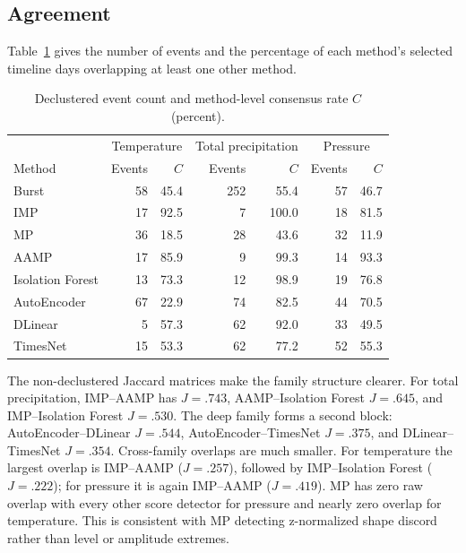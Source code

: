 \documentclass[11pt,a4paper]{article}
\begin{document}
\subsection{Agreement}
Table~\ref{tab:agreement} gives the number of events and the percentage of each
method's selected timeline days overlapping at least one other method.

\begin{table}[ht]
\centering
\caption{Declustered event count and method-level consensus rate $C$ (percent).}
\label{tab:agreement}
\small
\begin{tabular}{lrr@{\qquad}rr@{\qquad}rr}
\toprule
& \multicolumn{2}{c}{Temperature} & \multicolumn{2}{c}{Total precipitation}
& \multicolumn{2}{c}{Pressure}\\
Method & Events & $C$ & Events & $C$ & Events & $C$\\
\midrule
Burst             & 58 & 45.4 & 252 & 55.4 & 57 & 46.7\\
IMP               & 17 & 92.5 &   7 &100.0 & 18 & 81.5\\
MP                & 36 & 18.5 &  28 & 43.6 & 32 & 11.9\\
AAMP              & 17 & 85.9 &   9 & 99.3 & 14 & 93.3\\
Isolation Forest  & 13 & 73.3 &  12 & 98.9 & 19 & 76.8\\
AutoEncoder       & 67 & 22.9 &  74 & 82.5 & 44 & 70.5\\
DLinear           &  5 & 57.3 &  62 & 92.0 & 33 & 49.5\\
TimesNet          & 15 & 53.3 &  62 & 77.2 & 52 & 55.3\\
\bottomrule
\end{tabular}
\end{table}

The non-declustered Jaccard matrices make the family structure clearer.
For total precipitation, IMP--AAMP has $J=.743$, AAMP--Isolation Forest $J=.645$,
and IMP--Isolation Forest $J=.530$. The deep family forms a second block:
AutoEncoder--DLinear $J=.544$, AutoEncoder--TimesNet $J=.375$, and
DLinear--TimesNet $J=.354$. Cross-family overlaps are much smaller. For
temperature the largest overlap is IMP--AAMP ($J=.257$), followed by
IMP--Isolation Forest ($J=.222$); for pressure it is again IMP--AAMP
($J=.419$). MP has zero raw overlap with every other score detector for
pressure and nearly zero overlap for temperature. This is consistent with MP
detecting z-normalized shape discord rather than level or amplitude extremes.
\end{document}
